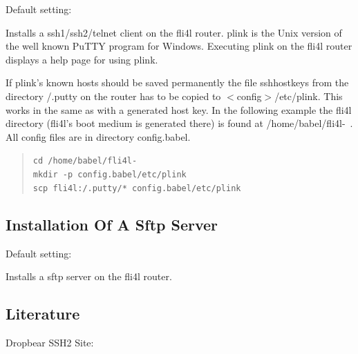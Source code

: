 \begin{description}


  Default setting: 

  Installs a ssh1/ssh2/telnet client on the fli4l router. plink is the Unix 
  version of the well known PuTTY program for Windows. Executing plink on the 
  fli4l router displays a help page for using plink.

  If plink's known hosts should be saved permanently the file 
  sshhostkeys from the directory /.putty on the router has to be copied 
  to $<$config$>$/etc/plink. This works in the same as with a generated host key. 
  In the following example the fli4l directory (fli4l's boot medium is 
  generated there) is found at /home/babel/fli4l-\version~. All config 
  files are in directory config.babel.

\begin{example}
\begin{verse}
\texttt{cd /home/babel/fli4l-\version}\\
\texttt{mkdir -p config.babel/etc/plink}\\
\texttt{scp fli4l:/.putty/* config.babel/etc/plink}
\end{verse}
\end{example}

\end{description}

\subsection {Installation Of A Sftp Server}

\begin{description}


  Default setting: 

  Installs a sftp server on the fli4l router. 

\end{description}

\subsection{Literature}
Dropbear SSH2 Site: 
